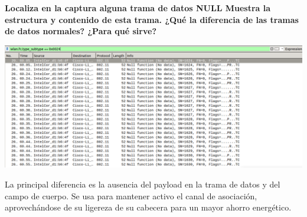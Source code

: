 \documentclass{article}
\begin{document}
\textbf{Localiza en la captura alguna trama de datos NULL Muestra la estructura y
contenido de esta trama. ¿Qué la diferencia de las tramas de datos normales? ¿Para qué sirve?}

\begin{center}
\includegraphics[scale=0.3]{WLAN/nf.png}
\end{center}

La principal diferencia es la ausencia del payload en la trama de datos y del campo de cuerpo. Se usa para mantener activo el canal de asociación, aprovechándose de su ligereza de su cabecera para un mayor ahorro energético.
\end{document}
